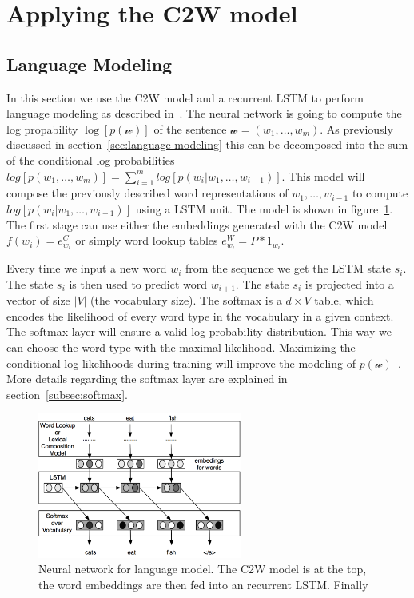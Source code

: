 \section{Applying the C2W model}

\subsection{Language Modeling}
\label{subsec:language-model-c2w}

In this section we use the C2W model and a recurrent LSTM to perform language modeling as 
described in~\cite{DBLP:journals/corr/LingLMAADBT15}.
The neural network is going to compute the log propability $\log[ p(\mathcal{w}) ]$ of the 
sentence $\mathcal{w} = (w_1, \dots, w_m)$. As previously discussed in section~\ref{sec:language-modeling} this can be 
decomposed into the sum of the conditional log probabilities $log[ p(w_1,\dots,w_m) ] = \sum_{i=1}^{m} log[ p(w_i | w_1,\dots,w_{i-1}) ]$.
This model will compose the previously described word representations of $w_1,\dots,w_{i-1}$ to compute 
$log[ p(w_i | w_1,\dots,w_{i-1}) ]$ using a LSTM unit.
The model is shown in figure~\ref{fig:c2w-language-model}. The first stage can use either the embeddings generated with the C2W model
$f(w_i) = e_{w_i}^C $ or simply word lookup tables $e_{w_i}^W = P * 1_{w_i}$.

Every time we input a new word $w_i$ from the sequence we get the LSTM state $s_i$. The state $s_i$ is then used to predict word $w_{i+1}$.
The state $s_i$ is projected into a vector of size $|V|$ (the vocabulary size). The softmax is a $d \times V$ table, 
which encodes the likelihood of every word type in the vocabulary in a given context. 
The softmax layer will ensure a valid log probability distribution. This way we can choose the word type with the maximal likelihood.
Maximizing the conditional log-likelihoods during training will improve the modeling 
of $p(\mathcal{w})$~\cite{DBLP:conf/interspeech/MikolovKBCK10}.
More details regarding the softmax layer are explained in section~\ref{subsec:softmax}.

\begin{figure}[H]
\begin{center}
  \includegraphics[width=0.6\textwidth]{./img/c2w-language-model}
  \caption{Neural network for language model. The C2W model is at the top, the word embeddings are then fed into an recurrent LSTM.
  Finally }
  \label{fig:c2w-language-model}
\end{center}
\end{figure}


